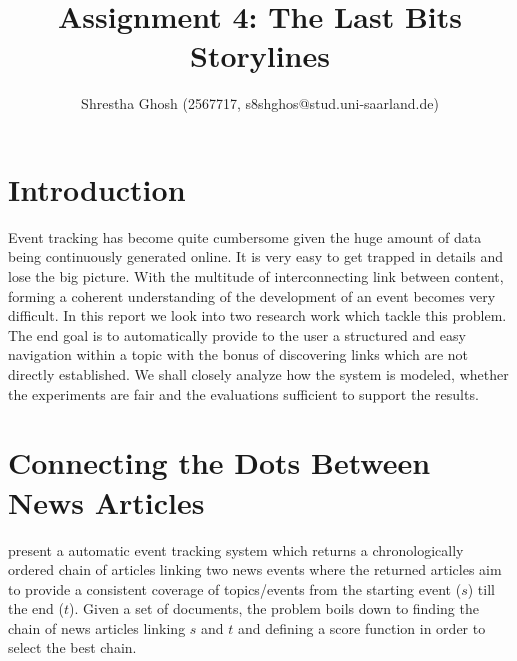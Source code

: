 \documentclass[10pt]{article}
\title{Assignment 4: The Last Bits\\
      Storylines}
\author{Shrestha Ghosh (2567717, s8shghos@stud.uni-saarland.de)}
\begin{document}
\maketitle
\section{Introduction}
\par Event tracking has become quite cumbersome given the huge amount of data being continuously generated online. It is very easy to get trapped in details and lose the big picture. With the multitude of interconnecting link between content, forming a coherent understanding of the development of an event becomes very difficult. In this report we look into two research work which tackle this problem. The end goal is to automatically provide to the user a structured and easy navigation within a topic with the bonus of discovering links which are not directly established. We shall closely analyze how the system is modeled, whether the experiments are fair and the evaluations sufficient to support the results.       
\section{Connecting the Dots Between News Articles}
\citet{shahaf2010connecting} present a automatic event tracking system which returns a chronologically ordered chain of articles linking two news events where the returned articles aim to provide a consistent coverage of topics/events from the starting event ($s$) till the end ($t$). Given a set of documents, the problem boils down to finding the chain of news articles linking $s$ and $t$ and defining a score function in order to select the best chain.
\end{document}
